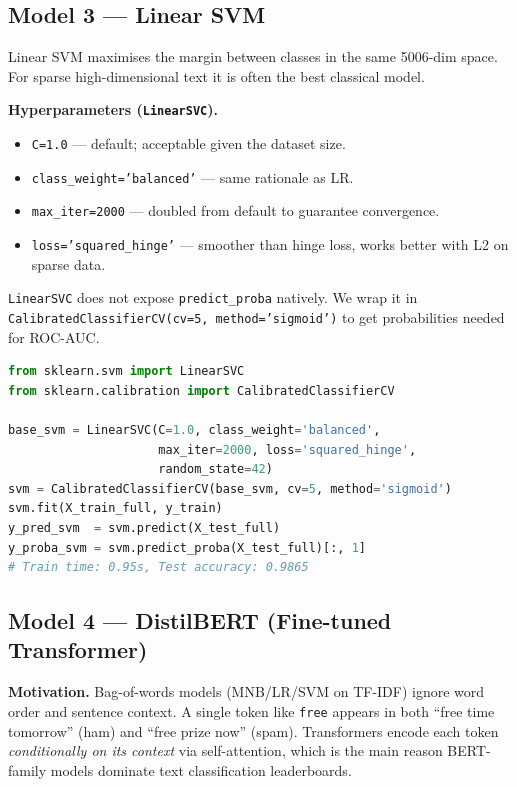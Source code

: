 \subsection{Model 3 --- Linear SVM}

Linear SVM maximises the margin between classes in the same 5006-dim space. For sparse high-dimensional text it is often the best classical model.

\textbf{Hyperparameters (\texttt{LinearSVC}).}
\begin{itemize}
    \item \texttt{C=1.0} --- default; acceptable given the dataset size.
    \item \texttt{class\_weight='balanced'} --- same rationale as LR.
    \item \texttt{max\_iter=2000} --- doubled from default to guarantee convergence.
    \item \texttt{loss='squared\_hinge'} --- smoother than hinge loss, works better with L2 on sparse data.
\end{itemize}

\texttt{LinearSVC} does not expose \texttt{predict\_proba} natively. We wrap it in \texttt{CalibratedClassifierCV(cv=5, method='sigmoid')} to get probabilities needed for ROC-AUC.

\begin{lstlisting}[language=Python]
from sklearn.svm import LinearSVC
from sklearn.calibration import CalibratedClassifierCV

base_svm = LinearSVC(C=1.0, class_weight='balanced',
                     max_iter=2000, loss='squared_hinge',
                     random_state=42)
svm = CalibratedClassifierCV(base_svm, cv=5, method='sigmoid')
svm.fit(X_train_full, y_train)
y_pred_svm  = svm.predict(X_test_full)
y_proba_svm = svm.predict_proba(X_test_full)[:, 1]
# Train time: 0.95s, Test accuracy: 0.9865
\end{lstlisting}

\subsection{Model 4 --- DistilBERT (Fine-tuned Transformer)}
\label{sec:a2_text_bert}

\textbf{Motivation.} Bag-of-words models (MNB/LR/SVM on TF-IDF) ignore word order and sentence context. A single token like \texttt{free} appears in both ``free time tomorrow'' (ham) and ``free prize now'' (spam). Transformers encode each token \emph{conditionally on its context} via self-attention, which is the main reason BERT-family models dominate text classification leaderboards.

